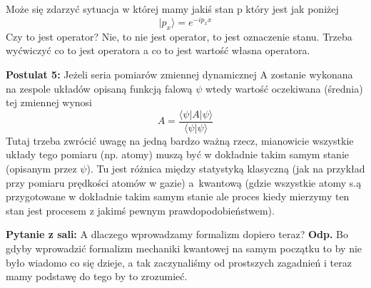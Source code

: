 Może się zdarzyć sytuacja w której mamy jakiś stan p który jest jak poniżej
\begin{equation*}
	|p_x \rangle = e^{-ip_x x}
\end{equation*}
Czy to jest operator? Nie, to nie jest operator, to jest oznaczenie stanu. Trzeba wyćwiczyć co to jest operatora a co to jest wartość własna operatora.

\iffalse $ napisane wyżej
\textbf{Definicja:} Operator Hermitowski A to jest taki operator który dla którego zachodzi
\begin{equation*}
	\left< x | (A\psi) \right> = \langle (Ax) \vert \psi \rangle
\end{equation*}
\begin{equation*}
	\left< x | (A\psi) \right> \equiv \langle x | A \vert \psi \rangle
\end{equation*}
Korzystając z powyższych możemy zapisać
\fi

\iffalse to powinno być znane, jest też wspomniane wyżej.
Jeśli $\psi_n$ są funkcjami własnymi operatora $A$ o wartościach własnych $a_n$, to
\begin{align*}
	&\left.
	\begin{aligned}
		\left< \psi_n | A | \psi_n \right> &= a_n \left< \psi_n | \psi_n \right> \\
		(A \psi_n)^* = a_n^* \psi_n^* &= \langle (A \psi_n) | \psi_n \rangle = a_n^* \left< \psi_n | \psi_n \right>
	\end{aligned}
	\right\}
	\Rightarrow a_n = a_n^*, \quad a_n \in \Re
\end{align*}
\fi

\textbf{Postulat 5:} Jeżeli seria pomiarów zmiennej dynamicznej A zostanie wykonana na zespole układów opisaną funkcją falową $\psi$ wtedy wartość oczekiwana (średnia) tej zmiennej wynosi
\begin{equation*}
	A = \frac{\langle \psi | A | \psi \rangle}{\langle\psi | \psi\rangle}
\end{equation*}
Tutaj trzeba zwrócić uwagę na jedną bardzo ważną rzecz, mianowicie wszystkie układy tego pomiaru (np. atomy) muszą być w dokładnie takim samym stanie
(opisanym przez $\psi$). Tu jest różnica między statystyką klasyczną
(jak na przykład przy pomiaru prędkości atomów w gazie) a~kwantową
(gdzie wszystkie atomy s.ą przygotowane w dokładnie takim samym
stanie ale proces kiedy mierzymy ten stan jest procesem z jakimś pewnym prawdopodobieństwem).

\textbf{Pytanie z sali:} A dlaczego wprowadzamy formalizm dopiero teraz? \textbf{Odp.} Bo gdyby wprowadzić formalizm mechaniki kwantowej na samym początku to by nie było wiadomo co się dzieje, a tak zaczynaliśmy od prostszych zagadnień i teraz mamy podstawę do tego by to zrozumieć.

